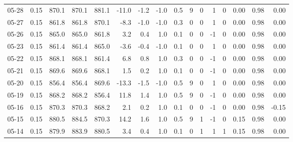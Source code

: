 \begin{threeparttable}
{\begin{tabular}{lrrrrrrrrrrrrrrr}
  05-28 &     0.15 & 870.1 & 870.1 & 881.1 &      -11.0 &           -1.2 &                     -1.0 &                 0.5 &              9 &         0 &     1 &         0 &       0.00 &      0.98 &           0.00 \\
  05-27 &     0.15 & 861.8 & 861.8 & 870.1 &       -8.3 &           -1.0 &                     -1.0 &                 0.3 &              0 &         0 &     1 &         0 &       0.00 &      0.98 &           0.00 \\
  05-26 &     0.15 & 865.0 & 865.0 & 861.8 &        3.2 &            0.4 &                      1.0 &                 0.1 &              0 &         0 &    -1 &         0 &       0.00 &      0.98 &           0.00 \\
  05-23 &     0.15 & 861.4 & 861.4 & 865.0 &       -3.6 &           -0.4 &                     -1.0 &                 0.1 &              0 &         0 &     1 &         0 &       0.00 &      0.98 &           0.00 \\
  05-22 &     0.15 & 868.1 & 868.1 & 861.4 &        6.8 &            0.8 &                      1.0 &                 0.3 &              0 &         0 &    -1 &         0 &       0.00 &      0.98 &           0.00 \\
  05-21 &     0.15 & 869.6 & 869.6 & 868.1 &        1.5 &            0.2 &                      1.0 &                 0.1 &              0 &         0 &    -1 &         0 &       0.00 &      0.98 &           0.00 \\
  05-20 &     0.15 & 856.4 & 856.4 & 869.6 &      -13.3 &           -1.5 &                     -1.0 &                 0.5 &              9 &         0 &     1 &         0 &       0.00 &      0.98 &           0.00 \\
  05-19 &     0.15 & 868.2 & 868.2 & 856.4 &       11.8 &            1.4 &                      1.0 &                 0.5 &              9 &         0 &    -1 &         0 &       0.00 &      0.98 &           0.00 \\
  05-16 &     0.15 & 870.3 & 870.3 & 868.2 &        2.1 &            0.2 &                      1.0 &                 0.1 &              0 &         0 &    -1 &         0 &       0.00 &      0.98 &          -0.15 \\
  05-15 &     0.15 & 880.5 & 884.5 & 870.3 &       14.2 &            1.6 &                      1.0 &                 0.5 &              9 &         1 &    -1 &         0 &       0.15 &      0.98 &           0.00 \\
  05-14 &     0.15 & 879.9 & 883.9 & 880.5 &        3.4 &            0.4 &                      1.0 &                 0.1 &              0 &         1 &     1 &         1 &       0.15 &      0.98 &           0.00 \\

\end{tabular}}
\end{threeparttable}
